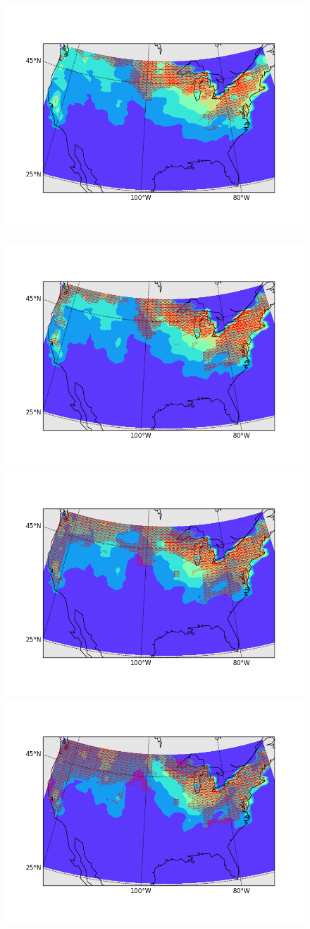 \documentclass{article} %
\begin{document}
\begin{figure}
\includegraphics[width =.5 \textwidth ]{../code/swallowpics/bird18.png} \vspace{-20pt}
\end{figure} 

 \begin{figure}\vspace{-20pt}
\includegraphics[width =.5 \textwidth ]{../code/swallowpics/bird20.png}\vspace{-20pt}
\includegraphics[width =.5 \textwidth ]{../code/swallowpics/bird22.png} \vspace{-20pt}
\includegraphics[width =.5 \textwidth ]{../code/swallowpics/bird24.png}

\end{figure}
\end{document}
